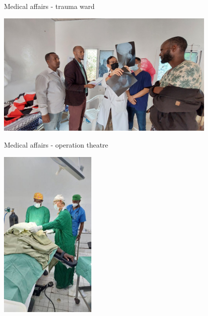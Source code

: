 \documentclass[aspectratio=169]{beamer}
\begin{document}
\begin{frame}{Medical affairs - trauma ward}
    \begin{center}
        \includegraphics[width=0.8\textwidth]{IMG-4862827583386425169.de8939a35ce768375740b709dce51958.23032108.JPG}
    \end{center}
\end{frame}
    
\begin{frame}{Medical affairs - operation theatre}
    \begin{center}
        \includegraphics[width=0.35\textwidth]{51744_old_table.jpg}
    \end{center}
\end{frame}
\end{document}
